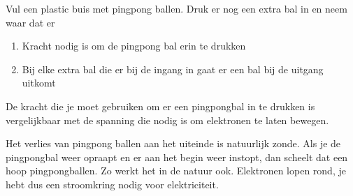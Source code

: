 Vul een plastic buis met pingpong ballen. Druk er nog een extra bal in en neem waar dat er 
\begin{enumerate}
\item Kracht nodig is om de pingpong bal erin te drukken
\item Bij elke extra bal die er bij de ingang in gaat er een bal bij de uitgang uitkomt
\end{enumerate}

De kracht die je moet gebruiken om er een pingpongbal in te drukken is vergelijkbaar met de spanning die nodig is om elektronen te laten bewegen.

Het verlies van pingpong ballen aan het uiteinde is natuurlijk zonde. Als je de pingpongbal weer opraapt en er aan het begin weer instopt, dan scheelt dat een hoop pingpongballen. Zo werkt het in de natuur ook. Elektronen lopen rond, je hebt dus een stroomkring nodig voor elektriciteit.
